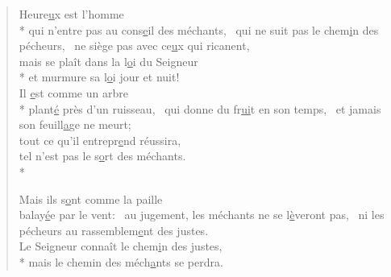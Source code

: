 \begin{verse}
Heure\underline{u}x est l’homme \\*
qui n’entre pas au cons\underline{e}il des méchants,~\psalmdagger
qui ne suit pas le chem\underline{i}n des pécheurs,~\psalmstar
ne siège pas avec ce\underline{u}x qui ricanent, \\

mais se plaît dans la l\underline{o}i du Seigneur \\*
et murmure sa l\underline{o}i jour et nuit! \\

Il \underline{e}st comme un arbre \\*
plant\underline{é} près d’un ruisseau,~\psalmdagger
qui donne du fr\underline{ui}t en son temps,~\psalmstar
et jamais son feuill\underline{a}ge ne meurt; \\
tout ce qu’il entrepr\underline{e}nd réussira, \\
tel n’est pas le s\underline{o}rt des méchants. \\*

Mais ils s\underline{o}nt comme la paille \\
balay\underline{é}e par le vent:~\psalmdagger
{}au jugement, les méchants ne se l\underline{è}veront pas,~\psalmstar
ni les pécheurs au rassemblem\underline{e}nt des justes. \\
Le Seigneur connaît le chem\underline{i}n des justes, \\*
mais le chemin des méch\underline{a}nts se perdra. \\
\end{verse}

